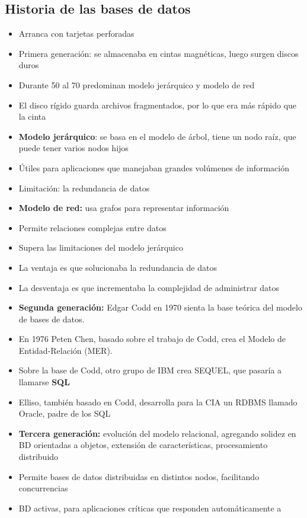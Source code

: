 \subsection{Historia de las bases de datos}
\begin{itemize}
    \item Arranca con tarjetas perforadas
    \item Primera generación: se almacenaba en cintas magnéticas,
    luego surgen discos duros
    \item Durante 50 al 70 predominan modelo jerárquico y modelo de red
    \item El disco rígido guarda archivos fragmentados, 
    por lo que era más rápido que la cinta
    \item \textbf{Modelo jerárquico}: se basa en el modelo de árbol,
    tiene un nodo raíz, que puede tener varios nodos hijos
    \item Útiles para aplicaciones que manejaban grandes volúmenes de información 
    \item Limitación: la redundancia de datos
    \item \textbf{Modelo de red:} usa grafos para representar información 
    \item Permite relaciones complejas entre datos 
    \item Supera las limitaciones del modelo jerárquico 
    \item La ventaja es que solucionaba la redundancia de datos 
    \item La desventaja es que incrementaba la complejidad de administrar datos 
    \item \textbf{Segunda generación:} Edgar Codd en 1970 sienta la base teórica
    del modelo de bases de datos.
    \item En 1976 Peten Chen, basado sobre el trabajo de Codd, crea el 
    Modelo de Entidad-Relación (MER).
    \item Sobre la base de Codd, otro grupo de IBM crea SEQUEL, que pasaría a 
    llamarse \textbf{SQL}
    \item Elliso, también basado en Codd, desarrolla para la CIA un RDBMS llamado
    Oracle, padre de los SQL 
    \item \textbf{Tercera generación:} evolución del modelo relacional,
    agregando solidez en BD orientadas a objetos, extensión de características,
    procesamiento distribuido
    \item Permite bases de datos distribuidas en distintos nodos,
    facilitando concurrencias
    \item BD activas, para aplicaciones críticas que responden automáticamente a 

\end{itemize}
